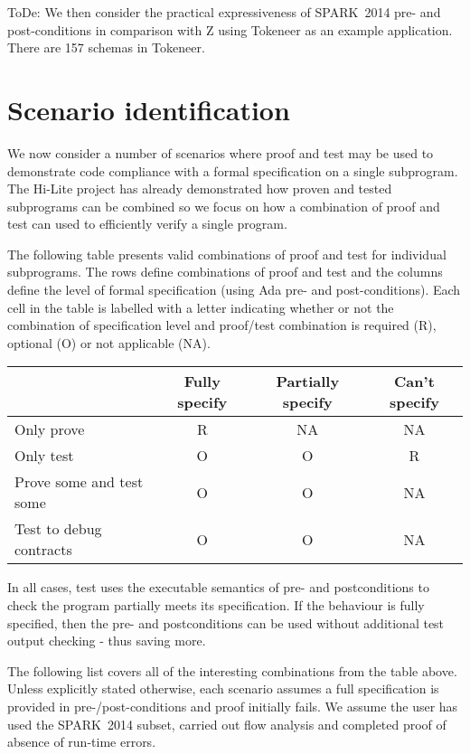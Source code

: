 \documentclass{llncs}
\newcommand{\newspark}{SPARK~2014\xspace}
\begin{document}
ToDe: We then consider the practical expressiveness of \newspark pre-
and post-conditions in comparison with Z using Tokeneer as an example
application. There are 157 schemas in Tokeneer.


\section{Scenario identification}

We now consider a number of scenarios where proof and test may be
used to demonstrate code compliance with a formal
specification on a single subprogram.  The Hi-Lite project has already
demonstrated \cite{hiliteERTS2012} how proven and tested subprograms 
can be combined so we focus on how a combination of proof and test
can used to efficiently verify a single program.

The following table presents valid combinations of proof and test
for individual subprograms. The rows define combinations of proof
and test and the columns define the level of formal specification
(using Ada pre- and post-conditions). Each cell in the table is
labelled with a letter indicating whether or not the combination
of specification level and proof/test combination is required (R),
optional (O) or not applicable (NA).

\begin{center}
\begin{tabular}{l | c | c | c}
    & Fully specify & Partially specify & Can't specify \\
  \hline
  Only prove & R & NA & NA \\
  Only test & O & O & R \\
  Prove some and test some & O & O & NA \\
  Test to debug contracts & O & O & NA \\
\end{tabular}
\end{center}

In all cases, test uses the executable semantics of pre- and 
postconditions to check the program partially meets its specification.
If the behaviour is fully specified, then the pre- and postconditions 
can be used without additional test output checking - thus saving more.

The following list covers all of the interesting combinations from 
the table above.
Unless explicitly stated
otherwise, each scenario assumes a full specification is provided in
pre-/post-conditions and proof initially fails.  
We assume the user has used the \newspark subset,
carried out flow analysis and completed proof of absence of run-time
errors.
\end{document}
